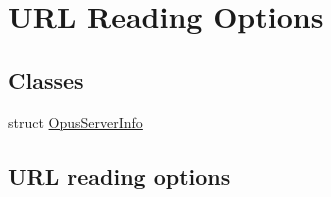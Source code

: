 \hypertarget{group__url__options}{}\section{U\+RL Reading Options}
\label{group__url__options}
\subsection*{Classes}
\begin{DoxyCompactItemize}
\item 
struct \mbox{\hyperlink{struct_opus_server_info}{Opus\+Server\+Info}}
\end{DoxyCompactItemize}
\subsection*{U\+RL reading options}
\label{_amgrp723df1257afe999c3e0dda4938bf95e0}%
